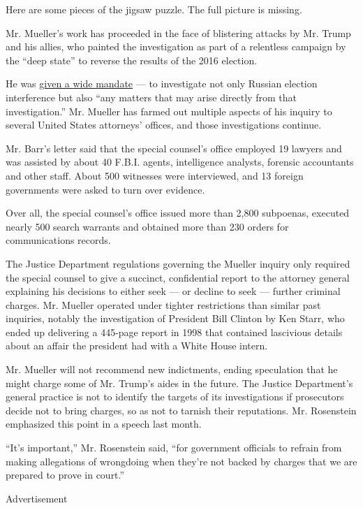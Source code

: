 Here are some pieces of the jigsaw puzzle. The full picture is missing.

Mr. Mueller's work has proceeded in the face of blistering attacks by
Mr. Trump and his allies, who painted the investigation as part of a
relentless campaign by the ``deep state'' to reverse the results of the
2016 election.

He was
\href{https://www.justice.gov/opa/press-release/file/967231/download}{given
a wide mandate} --- to investigate not only Russian election
interference but also ``any matters that may arise directly from that
investigation.'' Mr. Mueller has farmed out multiple aspects of his
inquiry to several United States attorneys' offices, and those
investigations continue.

Mr. Barr's letter said that the special counsel's office employed 19
lawyers and was assisted by about 40 F.B.I. agents, intelligence
analysts, forensic accountants and other staff. About 500 witnesses were
interviewed, and 13 foreign governments were asked to turn over
evidence.

Over all, the special counsel's office issued more than 2,800 subpoenas,
executed nearly 500 search warrants and obtained more than 230 orders
for communications records.

The Justice Department regulations governing the Mueller inquiry only
required the special counsel to give a succinct, confidential report to
the attorney general explaining his decisions to either seek --- or
decline to seek --- further criminal charges. Mr. Mueller operated under
tighter restrictions than similar past inquiries, notably the
investigation of President Bill Clinton by Ken Starr, who ended up
delivering a 445-page report in 1998 that contained lascivious details
about an affair the president had with a White House intern.

Mr. Mueller will not recommend new indictments, ending speculation that
he might charge some of Mr. Trump's aides in the future. The Justice
Department's general practice is not to identify the targets of its
investigations if prosecutors decide not to bring charges, so as not to
tarnish their reputations. Mr. Rosenstein emphasized this point in a
speech last month.

``It's important,'' Mr. Rosenstein said, ``for government officials to
refrain from making allegations of wrongdoing when they're not backed by
charges that we are prepared to prove in court.''

Advertisement

